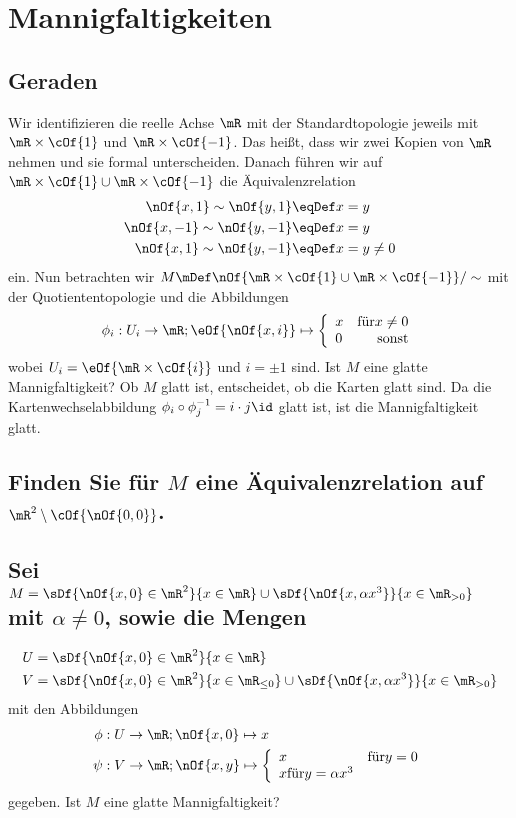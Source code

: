 \section{Mannigfaltigkeiten}
\subsection{Geraden}
Wir identifizieren die reelle Achse $\mR$ mit der Standardtopologie jeweils mit $\mR\times\cOf{1}$ und $\mR\times\cOf{-1}$. Das heißt, dass wir zwei Kopien von $\mR$ nehmen und sie formal unterscheiden. Danach führen wir auf $\mR\times\cOf{1}\cup\mR\times\cOf{-1}$ die Äquivalenzrelation
\begin{align}
	\nOf{x,1}\sim\nOf{y,1}&\eqDef x = y \\
	\nOf{x,-1}\sim\nOf{y,-1}&\eqDef x = y \\
	\nOf{x,1}\sim\nOf{y,-1}&\eqDef x = y \neq 0
\end{align}
ein. Nun betrachten wir $M\mDef\nOf{\mR\times\cOf{1}\cup\mR\times\cOf{-1}}/\sim$ mit der Quotiententopologie und die Abbildungen
\begin{equation}
	\phi_i : U_i \to \mR; \eOf{\nOf{x,i}} \mapsto \left\{\begin{array}{l r}x & \text{für} x \neq 0\\0&\text{sonst}\end{array}\right.
\end{equation}
wobei $U_i = \eOf{\mR\times\cOf{i}}$ und $i = \pm 1$ sind. Ist $M$ eine glatte Mannigfaltigkeit?
Ob $M$ glatt ist, entscheidet, ob die Karten glatt sind. Da die Kartenwechselabbildung $\phi_i\circ\phi_j^{-1} = i\cdot j\id$ glatt ist, ist die Mannigfaltigkeit glatt.

\subsection{Finden Sie für $M$ eine Äquivalenzrelation auf $\mR^2\setminus\cOf{\nOf{0,0}}$.}


\subsection{Sei $M = \sDf{\nOf{x,0}\in\mR^2}{x\in\mR}\cup\sDf{\nOf{x,\alpha x^3}}{x\in\mR_{>0}}$ mit $\alpha\neq 0$, sowie die Mengen}
\begin{align}
	U & = \sDf{\nOf{x,0}\in\mR^2}{x\in\mR} \\
	V & = \sDf{\nOf{x,0}\in\mR^2}{x\in\mR_{\leq 0}}\cup\sDf{\nOf{x,\alpha x^3}}{x\in\mR_{>0}}
\end{align}
mit den Abbildungen
\begin{align}
	\phi &: U \to \mR; \nOf{x,0} \mapsto x \\
	\psi &: V \to \mR; \nOf{x,y} \mapsto \left\{\begin{array}{l l}x & \text{für} y = 0\\x \text{für} y = \alpha x^3\end{array}\right.
\end{align}
gegeben. Ist $M$ eine glatte Mannigfaltigkeit?